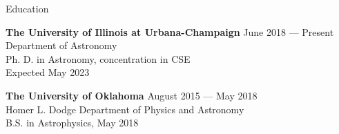 \documentclass{resume} %
\begin{document}

\begin{rSection}{Education}{}

{\bf The University of Illinois at Urbana-Champaign} \hfill { June 2018 --- Present} \\
Department of Astronomy \\
Ph. D. in Astronomy, concentration in CSE\\
Expected May 2023 

{\bf The University of Oklahoma} \hfill { August 2015 --- May 2018} \\ 
Homer L. Dodge Department of Physics and Astronomy \\
B.S. in Astrophysics, May 2018

\end{rSection}

\end{document}
